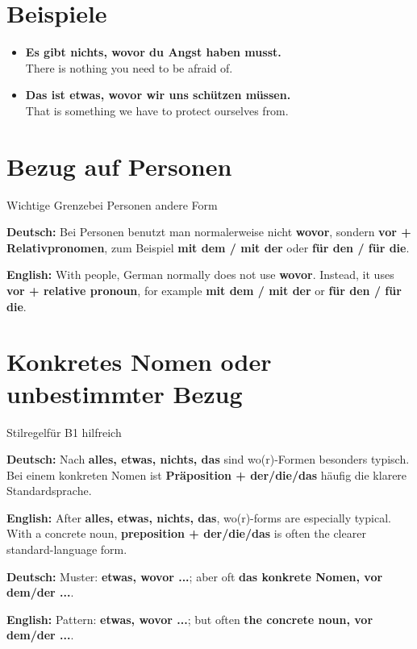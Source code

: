 \documentclass[a4paper,11pt]{article}
\newcommand{\GermanText}[1]{\textbf{Deutsch: }#1\par}
\newcommand{\EnglishText}[1]{{\small\color{SoftGray}\textbf{English: }#1\par}}
\newcommand{\ExampleItem}[2]{\item \textbf{#1}\\{\small\color{SoftGray}#2}}
\begin{document}
\section{Beispiele}

\begin{exbox}

\begin{itemize}

\ExampleItem{Es gibt nichts, wovor du Angst haben musst.}{There is nothing you need to be afraid of.}

\ExampleItem{Das ist etwas, wovor wir uns schützen müssen.}{That is something we have to protect ourselves from.}

\end{itemize}

\end{exbox}

\section{Bezug auf Personen}

\begin{grammarentry}{Wichtige Grenze}{bei Personen andere Form}

\GermanText{Bei Personen benutzt man normalerweise nicht \textbf{wovor}, sondern \textbf{vor + Relativpronomen}, zum Beispiel \textbf{mit dem / mit der} oder \textbf{für den / für die}.}

\EnglishText{With people, German normally does not use \textbf{wovor}. Instead, it uses \textbf{vor + relative pronoun}, for example \textbf{mit dem / mit der} or \textbf{für den / für die}.}

\end{grammarentry}

\section{Konkretes Nomen oder unbestimmter Bezug}

\begin{grammarentry}{Stilregel}{für B1 hilfreich}

\GermanText{Nach \textbf{alles, etwas, nichts, das} sind wo(r)-Formen besonders typisch. Bei einem konkreten Nomen ist \textbf{Präposition + der/die/das} häufig die klarere Standardsprache.}

\EnglishText{After \textbf{alles, etwas, nichts, das}, wo(r)-forms are especially typical. With a concrete noun, \textbf{preposition + der/die/das} is often the clearer standard-language form.}

\GermanText{Muster: \textbf{etwas, wovor ...}; aber oft \textbf{das konkrete Nomen, vor dem/der ...}.}

\EnglishText{Pattern: \textbf{etwas, wovor ...}; but often \textbf{the concrete noun, vor dem/der ...}.}

\end{grammarentry}
\end{document}
